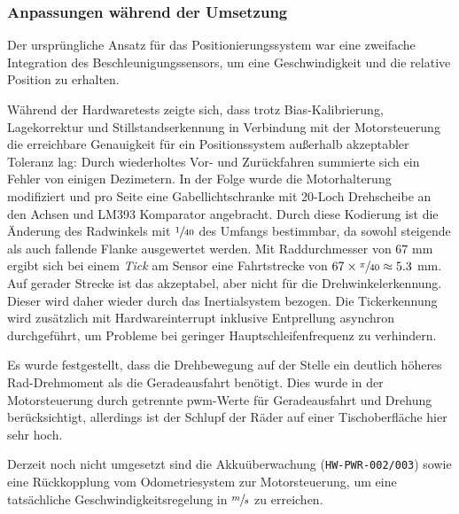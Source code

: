 \subsubsection*{Anpassungen während der Umsetzung}

Der ursprüngliche Ansatz für das Positionierungssystem war eine zweifache Integration des Beschleunigungssensors, um eine Geschwindigkeit und die relative Position zu erhalten. 

Während der Hardwaretests zeigte sich, dass trotz Bias-Kalibrierung, Lagekorrektur und Stillstandserkennung in Verbindung mit der Motorsteuerung die erreichbare Genauigkeit für ein Positionssystem außerhalb akzeptabler Toleranz lag: Durch wiederholtes Vor- und Zurückfahren summierte sich ein Fehler von einigen Dezimetern. In der Folge wurde die Motorhalterung modifiziert und pro Seite eine Gabellichtschranke mit 20-Loch Drehscheibe an den Achsen und LM393 Komparator angebracht. Durch diese Kodierung ist die Änderung des Radwinkels mit $\sfrac{1}{40}$ des Umfangs bestimmbar, da sowohl steigende als auch fallende Flanke ausgewertet werden. Mit Raddurchmesser von $67$ mm ergibt sich bei einem \textit{Tick} am Sensor eine Fahrtstrecke von $67 \times \sfrac{\pi}{40} \approx 5.3$ mm. Auf gerader Strecke ist das akzeptabel, aber nicht für die Drehwinkelerkennung. Dieser wird daher wieder durch das Inertialsystem bezogen. Die Tickerkennung wird zusätzlich mit Hardwareinterrupt inklusive Entprellung asynchron durchgeführt, um Probleme bei geringer Hauptschleifenfrequenz zu verhindern. 

Es wurde festgestellt, dass die Drehbewegung auf der Stelle ein deutlich höheres Rad-Drehmoment als die Geradeausfahrt benötigt. Dies wurde in der Motorsteuerung durch getrennte \gls{pwm}-Werte für Geradeausfahrt und Drehung berücksichtigt, allerdings ist der Schlupf der Räder auf einer Tischoberfläche hier sehr hoch. %

Derzeit noch nicht umgesetzt sind die Akkuüberwachung (\texttt{HW-PWR-002/003}) sowie eine Rückkopplung vom Odometriesystem zur Motorsteuerung, um eine tatsächliche Geschwindigkeitsregelung in $\sfrac{m}{s}$ zu erreichen. %


